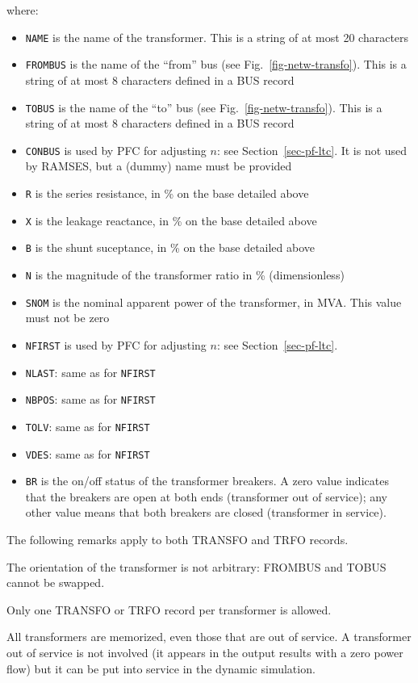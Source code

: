 where:
\begin{itemize}
\item {\tt NAME} is the name of the transformer.  This is a string of at most 20 characters
\item {\tt FROMBUS} is the name of the ``from'' bus (see Fig.~\ref{fig-netw-transfo}). This is a string of at most 8 characters defined in a BUS record
\item {\tt TOBUS} is the name of the ``to'' bus (see Fig.~\ref{fig-netw-transfo}). This is a string of at most 8 characters defined in a BUS record
\item{\tt CONBUS} is used by PFC for adjusting $n$: see Section~\ref{sec-pf-ltc}. It is not used by RAMSES, but a (dummy) name must be provided
\item{\tt R} is the series resistance, in \% on the base detailed above
\item{\tt X} is the leakage reactance, in \% on the base detailed above
\item{\tt B} is the shunt suceptance, in \% on the base detailed above
\item{\tt N} is the magnitude of the transformer ratio in \% (dimensionless)
\item{\tt SNOM} is the nominal apparent power of the transformer, in MVA. This value must not be zero
\item{\tt NFIRST} is used by PFC for adjusting $n$: see Section~\ref{sec-pf-ltc}.
\item{\tt NLAST}: same as for {\tt NFIRST}
\item{\tt NBPOS}: same as for {\tt NFIRST}
\item{\tt TOLV}: same as for {\tt NFIRST}
\item{\tt VDES}: same as for {\tt NFIRST}
\item{\tt BR} is the on/off status of the transformer breakers. A zero value indicates that the breakers are open at both ends (transformer out of service); any other value means that both breakers are closed (transformer in service).
\end{itemize}

The following remarks apply to both TRANSFO and TRFO records.

The orientation of the transformer is not arbitrary: FROMBUS and TOBUS cannot be swapped.

Only one TRANSFO or TRFO record per transformer is allowed.

All transformers are memorized, even those that are out of service. A transformer out of service is not involved (it appears in the output results with a zero power flow) but it can be put into service in the dynamic simulation.

